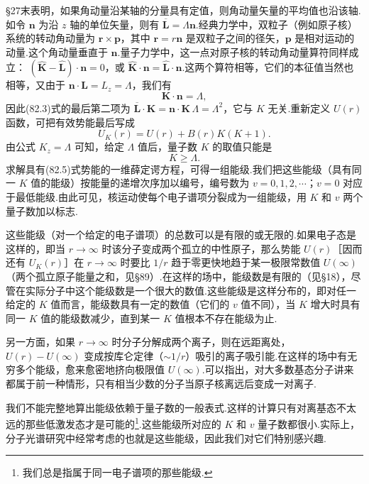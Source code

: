 §27末表明，如果角动量沿某轴的分量具有定值，则角动量矢量的平均值也沿该轴.如令 $\boldsymbol{n}$ 为沿 $z$ 轴的单位矢量，则有 $\overline{\boldsymbol{L}}=\Lambda\boldsymbol{n}$.经典力学中，双粒子（例如原子核）系统的转动角动量为 $\boldsymbol{r}\times\boldsymbol{p}$，其中 $\boldsymbol{r}=r\boldsymbol{n}$ 是双粒子之间的径矢，$\boldsymbol{p}$ 是相对运动的动量.这个角动量垂直于 $\boldsymbol{n}$.量子力学中，这一点对原子核的转动角动量算符同样成立：
$(\hat{\boldsymbol{K}}-\hat{\boldsymbol{L}})\cdot\boldsymbol{n}=0$，或 $\hat{\boldsymbol{K}}\cdot\boldsymbol{n}=\hat{\boldsymbol{L}}\cdot\boldsymbol{n}$.这两个算符相等，它们的本征值当然也相等，又由于 $\boldsymbol{n}\cdot\boldsymbol{L}=L_z=\Lambda$，我们有
\begin{equation}
  \boldsymbol{K}\cdot\boldsymbol{n}=\Lambda,
\end{equation}
因此(82.3)式的最后第二项为 $\overline{\boldsymbol{L}}\cdot\boldsymbol{K}=\boldsymbol{n}\cdot\boldsymbol{K}\,\Lambda=\Lambda^2$，它与 $K$ 无关.重新定义 $U(r)$ 函数，可把有效势能最后写成
\begin{equation}
  U_K(r)=U(r)+B(r)K(K+1).
\end{equation}
由公式 $K_z=\Lambda$ 可知，给定 $\Lambda$ 值后，量子数 $K$ 的取值只能是
\begin{equation}
  K\geqslant\Lambda.
\end{equation}
求解具有(82.5)式势能的一维薛定谔方程，可得一组能级.我们把这些能级（具有同一 $K$ 值的能级）按能量的递增次序加以编号，编号数为 $v=0,1,2,\cdots$；$v=0$ 对应于最低能级.由此可见，核运动使每个电子谱项分裂成为一组能级，用 $K$ 和 $v$ 两个量子数加以标志.

这些能级（对一个给定的电子谱项）的总数可以是有限的或无限的.如果电子态是这样的，即当 $r\to\infty$ 时该分子变成两个孤立的中性原子，那么势能 $U(r)$［因而还有 $U_K(r)$］在 $r\to\infty$ 时要比 $1/r$ 趋于零更快地趋于某一极限常数值 $U(\infty)$（两个孤立原子能量之和，见§89）.在这样的场中，能级数是有限的（见§18），尽管在实际分子中这个能级数是一个很大的数值.这些能级是这样分布的，即对任一给定的 $K$ 值而言，能级数具有一定的数值（它们的 $v$ 值不同），当 $K$ 增大时具有同一 $K$ 值的能级数减少，直到某一 $K$ 值根本不存在能级为止.

另一方面，如果 $r\to\infty$ 时分子分解成两个离子，则在远距离处，$U(r)-U(\infty)$ 变成按库仑定律（$\sim1/r$）吸引的离子吸引能.在这样的场中有无穷多个能级，愈来愈密地挤向极限值 $U(\infty)$.可以指出，对大多数基态分子讲来都属于前一种情形，只有相当少数的分子当原子核离远后变成一对离子.

我们不能完整地算出能级依赖于量子数的一般表式.这样的计算只有对离基态不太远的那些低激发态才是可能的\footnote{我们总是指属于同一电子谱项的那些能级.}.这些能级所对应的 $K$ 和 $v$ 量子数都很小.实际上，分子光谱研究中经常考虑的也就是这些能级，因此我们对它们特别感兴趣.

